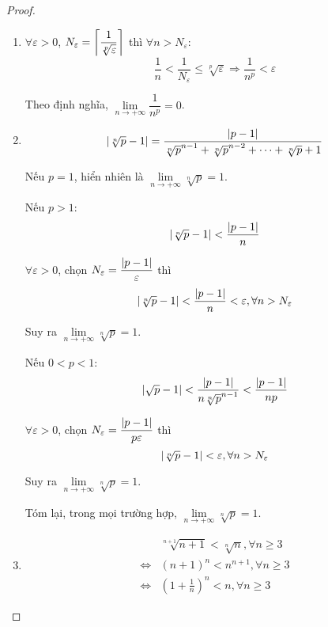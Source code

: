 \documentclass[class=analysis,crop=false]{standalone}
\begin{document}
\begin{proof}
    \begin{enumerate}[label = (\roman*)]
        \item $\forall\varepsilon > 0$, $N_{\varepsilon} = \left\lceil{\dfrac{1}{\sqrt[p]{\varepsilon}}}\right\rceil$ thì $\forall n > N_{\varepsilon}$:
            \[
                \frac{1}{n} < \frac{1}{N_{\varepsilon}} \le \sqrt[p]{\varepsilon} \Longrightarrow \frac{1}{n^{p}} < \varepsilon
            \]
            \par Theo định nghĩa, $\lim\limits_{n\to+\infty} \dfrac{1}{n^{p}} = 0$.
        \item
            \[
                \left\vert{\sqrt[n]{p} - 1}\right\vert = \frac{\left\vert{p-1}\right\vert}{\sqrt[n]{p}^{n-1} + \sqrt[n]{p}^{n-2} + \cdots + \sqrt[n]{p} + 1}
            \]
            \par Nếu $p = 1$, hiển nhiên là $\lim\limits_{n\to+\infty} \sqrt[n]{p} = 1$.
            \par Nếu $p > 1$:
            \[
                \left\vert{\sqrt[n]{p} - 1}\right\vert < \frac{\left\vert{p-1}\right\vert}{n}
            \]
            \par$\forall\varepsilon > 0$, chọn $N_{\varepsilon} = \dfrac{\left\vert{p-1}\right\vert}{\varepsilon}$ thì
            \[
                \left\vert{\sqrt[n]{p} - 1}\right\vert < \frac{\left\vert{p-1}\right\vert}{n} < \varepsilon, \forall n > N_{\varepsilon}
            \]
            \par Suy ra $\lim\limits_{n\to+\infty} \sqrt[n]{p} = 1$.
            \par Nếu $0 < p < 1$:
            \[
                \left\vert{\sqrt{p} - 1}\right\vert < \frac{\left\vert{p-1}\right\vert}{n\sqrt[n]{p}^{n-1}} < \frac{\left\vert{p-1}\right\vert}{np}
            \]
            \par$\forall\varepsilon > 0$, chọn $N_{\varepsilon} = \dfrac{\left\vert{p-1}\right\vert}{p\varepsilon}$ thì
            \[
                \left\vert{\sqrt[n]{p} - 1}\right\vert < \varepsilon, \forall n > N_{\varepsilon}
            \]
            \par Suy ra $\lim\limits_{n\to+\infty} \sqrt[n]{p} = 1$.
            \par Tóm lại, trong mọi trường hợp, $\lim\limits_{n\to+\infty} \sqrt[n]{p} = 1$.
        \item
            \begin{align*}
                &\sqrt[n+1]{n+1} < \sqrt[n]{n}, \forall n\ge 3 \\
                \Leftrightarrow&(n+1)^{n} < n^{n+1}, \forall n\ge 3 \\
                \Leftrightarrow&\left(1 + \frac{1}{n}\right)^{n} < n, \forall n\ge 3
            \end{align*}

\end{enumerate}
\end{proof}
\end{document}
